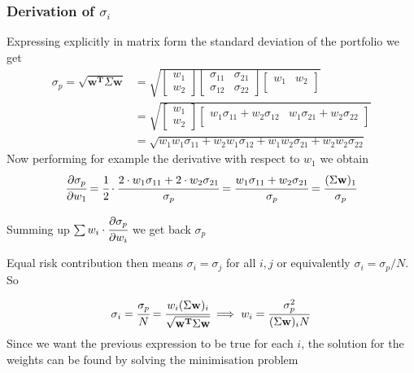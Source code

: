 \begin{attention}
\subsubsection{Derivation of $\sigma_i$}
Expressing explicitly in matrix form the standard deviation of the portfolio we get
\[
\begin{split}
	\sigma_p={\sqrt {\mathbf{w^T}\Sigma \mathbf{w}}} & =
	\sqrt{
		\begin{bmatrix}
			w_{1} \\
			w_{2}
		\end{bmatrix}
		\begin{bmatrix}
			\sigma_{11} & \sigma_{21} \\
			\sigma_{12} & \sigma_{22} 
		\end{bmatrix}
		\begin{bmatrix}
			w_{1} & w_{2} \\
		\end{bmatrix}
	}\\
	&=
	\sqrt{
		\begin{bmatrix}
			w_{1} \\
			w_{2}
		\end{bmatrix}
		\begin{bmatrix}
			w_{1}\sigma_{11} + w_{2}\sigma_{12} & w_{1}\sigma_{21} + w_{2}\sigma_{22} \\
		\end{bmatrix}
	} \\
	&= \sqrt{
		w_{1}w_{1}\sigma_{11} + w_{2}w_{1}\sigma_{12} + w_{1}w_{2}\sigma_{21} + w_{2}w_{2}\sigma_{22} }
\end{split}
\]
Now performing for example the derivative with respect to $w_1$ we obtain
\[\cfrac{\partial\sigma_p}{\partial w_1} = \cfrac{1}{2}\cdot\cfrac{2\cdot w_1\sigma_{11} + 2\cdot w_{2}\sigma_{21}}{\sigma_p} = \cfrac{w_1\sigma_{11} + w_{2}\sigma_{21}}{\sigma_p} = \cfrac{(\Sigma \mathbf{w})_{1}}{\sigma_p}\]

Summing up $\sum w_i\cdot\cfrac{\partial\sigma_p}{\partial w_i}$ we get back $\sigma_p$
\end{attention}

Equal risk contribution then means \(\sigma _{i} =\sigma _{j}\) for all
\(i,j\) or equivalently \(\sigma _{i}=\sigma_p/N\). So

\begin{equation}\sigma _{i} = \cfrac{\sigma_p}{N}={\cfrac {w_{i}(\Sigma \mathbf{w})_{i}}{\sqrt {\mathbf{w^T}\Sigma \mathbf{w}}}}\implies w_{i} = \frac {\sigma_p^{2}}{(\Sigma \mathbf{w})_{i}N}\end{equation}
Since we want the previous expression to be true for each $i$, the solution for the weights can be found by solving the minimisation problem

